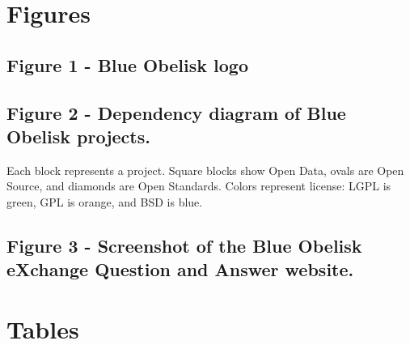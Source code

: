 \documentclass[10pt]{bmc_article}
\newenvironment{bmcformat}{\fussy\setboolean{publ}{true}}{\fussy}
\begin{document}
\begin{bmcformat}
{
   }     %





\section*{Figures}
  \subsection*{Figure 1 - Blue Obelisk logo}

  \subsection*{Figure 2 - Dependency diagram of Blue Obelisk projects.}
      Each block represents a project. Square blocks show Open Data, ovals are Open Source,
      and diamonds are Open Standards. Colors represent license: LGPL is green, GPL is orange,
      and BSD is blue.

  \subsection*{Figure 3 - Screenshot of the Blue Obelisk eXchange Question
    and Answer website.}



\section*{Tables}

\end{bmcformat}
\end{document}
